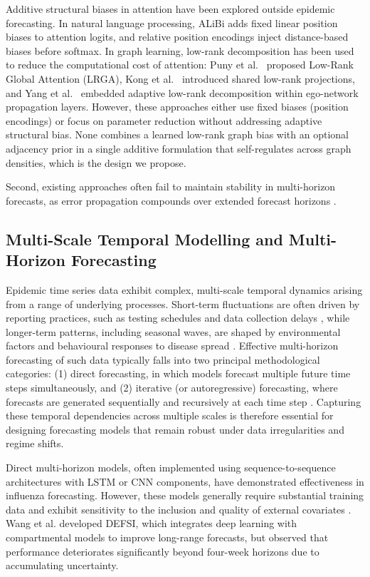 \documentclass[a4paper,fleqn]{cas-dc}
\begin{document}
Additive structural biases in attention have been explored outside epidemic forecasting. In natural language processing, ALiBi \cite{press2022train} adds fixed linear position biases to attention logits, and relative position encodings \cite{shaw2018self} inject distance-based biases before softmax. In graph learning, low-rank decomposition has been used to reduce the computational cost of attention: Puny et al.~\cite{puny2020global} proposed Low-Rank Global Attention (LRGA), Kong et al.~\cite{kong2023low} introduced shared low-rank projections, and Yang et al.~\cite{yang2023self} embedded adaptive low-rank decomposition within ego-network propagation layers. However, these approaches either use fixed biases (position encodings) or focus on parameter reduction without addressing adaptive structural bias. None combines a learned low-rank graph bias with an optional adjacency prior in a single additive formulation that self-regulates across graph densities, which is the design we propose.

Second, existing approaches often fail to maintain stability in multi-horizon forecasts, as error propagation compounds over extended forecast horizons \cite{Brooks2018Nonmechanistic}.


\subsection{Multi-Scale Temporal Modelling and Multi-Horizon Forecasting}

Epidemic time series data exhibit complex, multi-scale temporal dynamics arising from a range of underlying processes. Short-term fluctuations are often driven by reporting practices, such as testing schedules and data collection delays \cite{Panja2022Epicasting}, while longer-term patterns, including seasonal waves, are shaped by environmental factors and behavioural responses to disease spread \cite{Stone2007Seasonal}. Effective multi-horizon forecasting of such data typically falls into two principal methodological categories: (1) direct forecasting, in which models forecast multiple future time steps simultaneously, and (2) iterative (or autoregressive) forecasting, where forecasts are generated sequentially and recursively at each time step \cite{Brooks2018Nonmechanistic}. Capturing these temporal dependencies across multiple scales is therefore essential for designing forecasting models that remain robust under data irregularities and regime shifts.

Direct multi-horizon models, often implemented using sequence-to-sequence architectures with LSTM or CNN components, have demonstrated effectiveness in influenza forecasting. However, these models generally require substantial training data and exhibit sensitivity to the inclusion and quality of external covariates \cite{wu2018deep, venna2019novel}. Wang et al. \cite{wang2019defsi} developed DEFSI, which integrates deep learning with compartmental models to improve long-range forecasts, but observed that performance deteriorates significantly beyond four-week horizons due to accumulating uncertainty.
\end{document}
